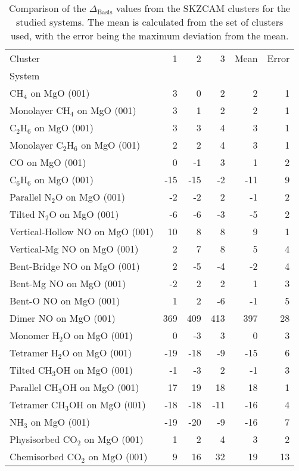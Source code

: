 \begin{table}
\caption{\label{tab:deltabasis}Comparison of the $\Delta_\textrm{Basis}$ values from the SKZCAM clusters for the studied systems. The mean is calculated from the set of clusters used, with the error being the maximum deviation from the mean.}
\begin{adjustbox}{center,max width=1\textwidth}
\begin{tabular}{lrrrrr}
\toprule
Cluster & 1 & 2 & 3 & Mean & Error \\ 
System &  &  &  &  &  \\
\midrule
CH$_4$ on MgO (001) & 3 & 0 & 2 & 2 & 1 \\
Monolayer CH$_4$ on MgO (001) & 3 & 1 & 2 & 2 & 1 \\
C$_2$H$_6$ on MgO (001) & 3 & 3 & 4 & 3 & 1 \\
Monolayer C$_2$H$_6$ on MgO (001) & 2 & 2 & 4 & 3 & 1 \\
CO on MgO (001) & 0 & -1 & 3 & 1 & 2 \\
C$_6$H$_6$ on MgO (001) & -15 & -15 & -2 & -11 & 9 \\
Parallel N$_2$O on MgO (001) & -2 & -2 & 2 & -1 & 2 \\
Tilted N$_2$O on MgO (001) & -6 & -6 & -3 & -5 & 2 \\
Vertical-Hollow NO on MgO (001) & 10 & 8 & 8 & 9 & 1 \\
Vertical-Mg NO on MgO (001) & 2 & 7 & 8 & 5 & 4 \\
Bent-Bridge NO on MgO (001) & 2 & -5 & -4 & -2 & 4 \\
Bent-Mg NO on MgO (001) & -2 & 2 & 2 & 1 & 3 \\
Bent-O NO on MgO (001) & 1 & 2 & -6 & -1 & 5 \\
Dimer NO on MgO (001) & 369 & 409 & 413 & 397 & 28 \\
Monomer H$_2$O on MgO (001) & 0 & -3 & 3 & 0 & 3 \\
Tetramer H$_2$O on MgO (001) & -19 & -18 & -9 & -15 & 6 \\
Tilted CH$_3$OH on MgO (001) & -1 & -3 & 2 & -1 & 3 \\
Parallel CH$_3$OH on MgO (001) & 17 & 19 & 18 & 18 & 1 \\
Tetramer CH$_3$OH on MgO (001) & -18 & -18 & -11 & -16 & 4 \\
NH$_3$ on MgO (001) & -19 & -20 & -9 & -16 & 7 \\
Physisorbed CO$_2$ on MgO (001) & 1 & 2 & 4 & 3 & 2 \\
Chemisorbed CO$_2$ on MgO (001) & 9 & 16 & 32 & 19 & 13 \\

\end{tabular}
\end{adjustbox}
\end{table}
